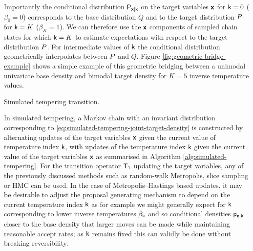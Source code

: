 Importantly the conditional distribution $\mathsf{P}_{\boldsymbol{\mathsf{x}}|\mathsf{k}}$ on the target variables $\boldsymbol{\mathsf{x}}$ for $\mathsf{k} = 0$ ($\beta_0 = 0$) corresponds to the base distribution $Q$ and to the target distribution $P$ for $\mathsf{k} = K$ ($\beta_K = 1$). We can therefore use the $\boldsymbol{\mathsf{x}}$ components of sampled chain states for which $\mathsf{k} = K$ to estimate expectations with respect to the target distribution $P$. For intermediate values of $\mathsf{k}$ the conditional distribution geometrically interpolates between $P$ and $Q$. Figure \ref{fig:geometric-bridge-example} shows a simple example of this geometric bridging between a unimodal univariate base density and bimodal target density for $K=5$ inverse temperature values.

\begin{algorithm}[!t]
\caption{Simulated tempering transition.}
\label{alg:simulated-tempering}

\end{algorithm}

In simulated tempering, a Markov chain with an invariant distribution corresponding to \eqref{eq:simulated-tempering-joint-target-density} is constructed by alternating updates of the target variables $\boldsymbol{\mathsf{x}}$ given the current value of temperature index $\mathsf{k}$, with updates of the temperature index $\mathsf{k}$ given the current value of the target variables $\boldsymbol{\mathsf{x}}$ as summarised in Algorithm \ref{alg:simulated-tempering}. For the transition operator $\mathsf{T}_1$ updating the target variables, any of the previously discussed methods such as random-walk Metropolis, slice sampling or \ac{HMC} can be used. In the case of Metropolis--Hastings based updates, it may be desirable to adjust the proposal generating mechanism to depend on the current temperature index $\mathsf{k}$ as for example we might generally expect for $\mathsf{k}$ corresponding to lower inverse temperatures $\beta_{\mathsf{k}}$ and so conditional densities $\mathsf{p}_{\boldsymbol{\mathsf{x}}|\mathsf{k}}$ closer to the base density that larger moves can be made while maintaining reasonable accept rates; as $\mathsf{k}$ remains fixed this can validly be done without breaking reversibility.

